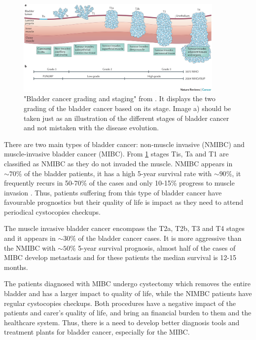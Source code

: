 \begin{figure}[!htb]    
    \centering
\includegraphics[width=0.9\textwidth,height=0.9\textheight,keepaspectratio]{Sections/Lit_review/Resources/bladder_cancer_grading.jpg}
    \caption{"Bladder cancer grading and staging" from \cite{Knowles2015-mu}. It displays the two grading of the bladder cancer based on its stage. Image a) should be taken just as an illustration of the different stages of bladder cancer and not mistaken with the disease evolution. }
    \label{fig:lit:bladder_cancer_stages}
\end{figure}


There are two main types of bladder cancer: non-muscle invasive (NMIBC) and muscle-invasive bladder cancer (MIBC). From \cref{fig:lit:bladder_cancer_stages} stages Tis, Ta and T1 are classified as NMIBC as they do not invaded the muscle. NMIBC appears in $\sim70\%$ of the bladder patients, it has a high 5-year survival rate with $\sim90\%$, it frequently recurs in 50-70\% of the cases and only 10-15\% progress to muscle invasion \cite{Knowles2015-mu}. Thus, patients suffering from this type of bladder cancer have favourable prognostics but their quality of life is impact as they need to attend periodical cystocopies checkups.

The muscle invasive bladder cancer encompass the T2a, T2b, T3 and T4 stages and it appears in $\sim30\%$ of the bladder cancer cases. It is more aggressive than the NMIBC with $\sim50\%$ 5-year survival prognosis, almost half of the cases of MIBC develop metastasis and for these patients the median survival is 12-15 months\cite{Knowles2015-mu}. 

The patients diagnosed with MIBC undergo cystectomy which removes the entire bladder and has a larger impact to quality of life, while the NIMBC patients have regular cystocopies checkups. Both procedures have a negative impact of the patients and carer's quality of life, and bring an financial burden to them and the healthcare system. Thus, there is a need to develop better diagnosis tools and treatment plants for bladder cancer, especially for the MIBC.

